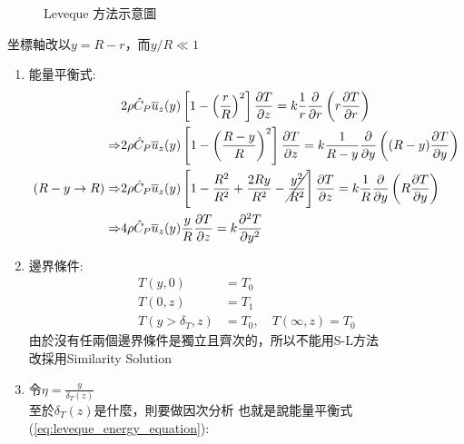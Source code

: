 \documentclass[../main.tex]{subfiles}
\begin{document}
\begin{itemize}
\begin{figure}[H]
    \caption{Leveque 方法示意圖}
  \end{figure}
  坐標軸改以$y=R-r$，而$y/R\ll 1$
  \begin{enumerate}
    \item 能量平衡式:
    \begin{align}
      &2\rho \hat C_P \overline u_z(y)\left[
        1 -\left(\frac{r}{R}\right)^2
      \right]\frac{\partial T}{\partial z} = k\frac{1}{r}\frac{\partial}{\partial r}\left(r\frac{\partial T}{\partial r}\right) \nonumber\\
      \Rightarrow&2\rho \hat C_P \overline u_z(y)\left[
        1 -\left(\frac{R-y}{R}\right)^2
      \right]\frac{\partial T}{\partial z} =
       k\frac{1}{R-y}\frac{\partial}{\partial y}\left((R-y)\frac{\partial T}{\partial y}\right)\nonumber\\
      (R-y\to R)\Rightarrow&2\rho \hat C_P \overline u_z(y)\left[
        1-\frac{R^2}{R^2} + \frac{2Ry}{R^2} - \cancel{\frac{y^2}{R^2}}
      \right]\frac{\partial T}{\partial z} = k \frac{1}{R} \frac{\partial }{\partial y}\left(
        R\frac{\partial T}{\partial y}
      \right) \nonumber\\
      \Rightarrow & 4\rho \hat  C_P \overline u_z(y)\frac{y}{R}\frac{\partial T}{\partial z}
      = k\frac{\partial^2 T}{\partial y^2} \label{eq:leveque_energy_equation}
    \end{align}
    \item 邊界條件:
    \begin{align}
      T(y,0) &= T_0 \\
      T(0,z) &= T_1 \\
      T(y>\delta_T,z) &= T_0,\quad T(\infty, z)=T_0
    \end{align}
    由於沒有任兩個邊界條件是獨立且齊次的，所以不能用S-L方法\\
    改採用Similarity Solution
    \item 令$\eta = \frac{y}{\delta_T(z)}$\\
    至於$\delta_T(z)$是什麼，則要做因次分析
    也就是說能量平衡式(\ref{eq:leveque_energy_equation}):

\end{enumerate}
\end{itemize}
\end{document}

